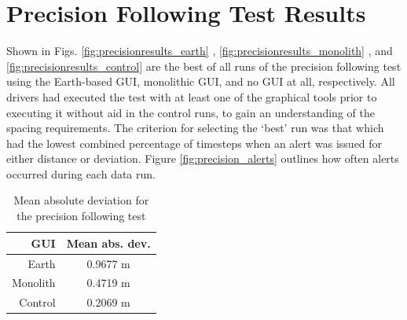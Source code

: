 \section{Precision Following Test Results} \label{sec:precisionfollowingresults}

Shown in Figs. \ref{fig:precisionresults_earth} , \ref{fig:precisionresults_monolith} , and \ref{fig:precisionresults_control} are the best of all runs of the precision following test using the Earth-based GUI, monolithic GUI, and no GUI at all, respectively. All drivers had executed the test with at least one of the graphical tools prior to executing it without aid in the control runs, to gain an understanding of the spacing requirements. The criterion for selecting the `best' run was that which had the lowest combined percentage of timesteps when an alert was issued for either distance or deviation. Figure \ref{fig:precision_alerts} outlines how often alerts occurred during each data run.

\begin{table}[htbp] \centering \caption{Mean absolute deviation for the precision following test}
\begin{tabular}{r|c} 
    GUI&    Mean abs. dev. \\ \hline\hline
    Earth&      0.9677 m \\
    Monolith&   0.4719 m \\
    Control&    0.2069 m \\ \hline   
\end{tabular} \label{tab:precision_dev_mean} \end{table}

